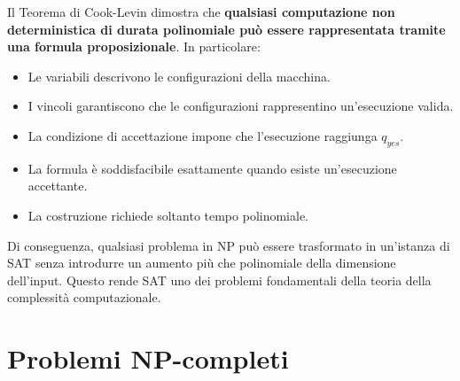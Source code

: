 \noindent Il Teorema di Cook-Levin dimostra che
\textbf{qualsiasi computazione non deterministica
di durata polinomiale può essere rappresentata
tramite una formula proposizionale}.
In particolare:
\begin{itemize}
    \item Le variabili descrivono le configurazioni
    della macchina.

    \item I vincoli garantiscono che le configurazioni
    rappresentino un'esecuzione valida.

    \item La condizione di accettazione impone
    che l'esecuzione raggiunga $q_{yes}$.

    \item La formula è soddisfacibile esattamente
    quando esiste un'esecuzione accettante.

    \item La costruzione richiede soltanto
    tempo polinomiale.
\end{itemize}
Di conseguenza, qualsiasi problema in NP
può essere trasformato in un'istanza di SAT
senza introdurre un aumento più che polinomiale
della dimensione dell'input.
Questo rende SAT uno dei problemi fondamentali
della teoria della complessità computazionale.



\section{Problemi NP-completi}
